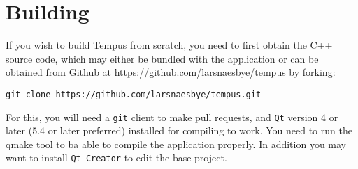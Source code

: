 \section{Building}

If you wish to build Tempus from scratch, you need to first obtain the C++ source code, which may either be bundled with the application or can be obtained from Github at https://github.com/larsnaesbye/tempus by forking:

\texttt{git clone https://github.com/larsnaesbye/tempus.git}

For this, you will need a \texttt{git} client to make pull requests, and \texttt{Qt} version 4 or later (5.4 or later preferred) installed for compiling to work. 
You need to run the qmake tool to ba able to compile the application properly.
In addition you may want to install \texttt{Qt Creator} to edit the base project.
